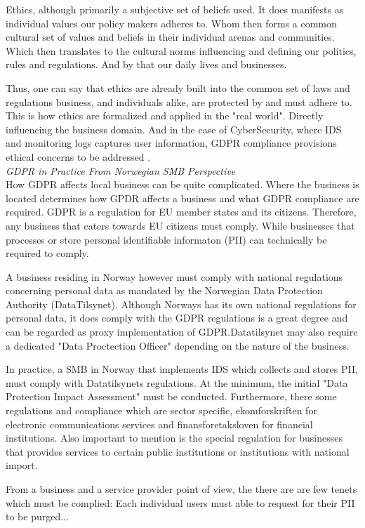 Ethics, although primarily a subjective set of beliefs used. It does manifests as individual values our policy makers adheres to. Whom then forms a common cultural set of values and beliefs in their individual arenas and communities. Which then translates to the cultural norms influencing and defining our politics, rules and regulations. And by that our daily lives and businesses. 

Thus, one can say that ethics are already built into the common set of laws and regulations business, and individuals alike, are protected by and must adhere to. This is how ethics are formalized and applied in the "real world". Directly influencing the business domain. And in the case of CyberSecurity, where IDS and monitoring logs captures user information, GDPR compliance provisions ethical concerns to be addressed \cite{Haberkorn2019}.
\\
\textit{GDPR in Practice From Norwegian SMB Perspective }\\

How GDPR affects local business can be quite complicated. Where the business is located determines how GPDR affects a business and what GDPR compliance are required. GDPR is a regulation for EU member states and its citizens. Therefore, any business that caters towards EU citizens must comply. While businesses that processes or store personal identifiable informaton\cite{EuropeanCommission-PII} (PII) can technically be required to comply\cite{Wolford-GDPR_outside_EU}.

A business residing in Norway however must comply with national regulations concerning personal data as mandated by the Norwegian Data Protection Authority (DataTilsynet). Although Norways has its own national regulations for personal data, it does comply with the GDPR regulations is a great degree and can be regarded as proxy implementation of GDPR.Datatilsynet may also require a dedicated "Data Proctection Officer" depending on the nature of the business\cite{Datatilsynet2019_personvernombud}.

In practice, a SMB in Norway that implements IDS which collects and stores PII, must comply with Datatilsynets regulations. At the minimum, the initial "Data Protection Impact Assessment" must be conducted. Furthermore, there some regulations and compliance which are sector specific, ekomforskriften for electronic communications services \cite{Lovdata2021_ekomforskriften} and finansforetaksloven \cite{Lovdata2016_finansforetaksloven} for financial institutions. Also important to mention is the special
regulation \cite{Lovdata2018_Sikkerhetsloven} for businesses that provides services to certain public institutions or institutions with national import.



From a business and a service provider point of view, the there are are few tenets which must be complied: Each individual users must able to request for their PII to be purged...